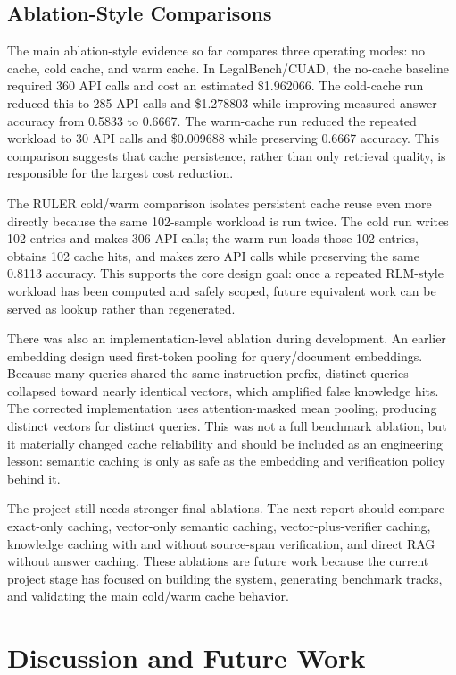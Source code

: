 \documentclass[10pt,a4paper]{article}
\begin{document}
\subsection{Ablation-Style Comparisons}

The main ablation-style evidence so far compares three operating modes: no cache, cold cache, and warm cache. In LegalBench/CUAD, the no-cache baseline required 360 API calls and cost an estimated \$1.962066. The cold-cache run reduced this to 285 API calls and \$1.278803 while improving measured answer accuracy from 0.5833 to 0.6667. The warm-cache run reduced the repeated workload to 30 API calls and \$0.009688 while preserving 0.6667 accuracy. This comparison suggests that cache persistence, rather than only retrieval quality, is responsible for the largest cost reduction.

The RULER cold/warm comparison isolates persistent cache reuse even more directly because the same 102-sample workload is run twice. The cold run writes 102 entries and makes 306 API calls; the warm run loads those 102 entries, obtains 102 cache hits, and makes zero API calls while preserving the same 0.8113 accuracy. This supports the core design goal: once a repeated RLM-style workload has been computed and safely scoped, future equivalent work can be served as lookup rather than regenerated.

There was also an implementation-level ablation during development. An earlier embedding design used first-token pooling for query/document embeddings. Because many queries shared the same instruction prefix, distinct queries collapsed toward nearly identical vectors, which amplified false knowledge hits. The corrected implementation uses attention-masked mean pooling, producing distinct vectors for distinct queries. This was not a full benchmark ablation, but it materially changed cache reliability and should be included as an engineering lesson: semantic caching is only as safe as the embedding and verification policy behind it.

The project still needs stronger final ablations. The next report should compare exact-only caching, vector-only semantic caching, vector-plus-verifier caching, knowledge caching with and without source-span verification, and direct RAG without answer caching. These ablations are future work because the current project stage has focused on building the system, generating benchmark tracks, and validating the main cold/warm cache behavior.

\section{Discussion and Future Work}
\end{document}
